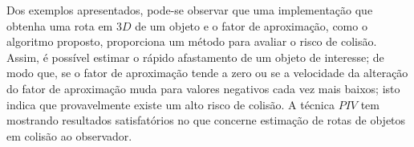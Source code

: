 
\begin{comment}
From the presented examples,
it can be observed that one application that uses the tracking
and the departure factor is related with the risk of collision.
It is possible to estimate how of fast an object is departing.
Thus, if the  departure factor tends to zero or 
if the velocity of departure factor changes to lower negatives values every time, 
probably, there is a high risk of collision. The $PIV$ technique has presented satisfactory results. 
It can be concluded that estimating collision using velocity of departure factor, 
tracking of objects in 2 or 3 dimensions, and departure distance
relative to the first position of $ROI$. 
The simulations in both cases has given promissory results.
\end{comment}

Dos exemplos apresentados, pode-se observar que uma implementação 
que obtenha uma rota em $3D$ de um objeto e o 
fator de aproximação, como o algoritmo proposto, proporciona um método para avaliar o risco de colisão.
Assim, é possível estimar o rápido afastamento de um objeto de interesse;
de modo que, se o fator de aproximação tende a zero ou se a velocidade da alteração 
do fator de aproximação muda 
para valores negativos cada vez mais baixos; isto indica que
provavelmente existe um alto risco de colisão.
A técnica $PIV$ tem mostrando resultados satisfatórios no que concerne estimação 
de rotas de objetos em colisão ao observador.
